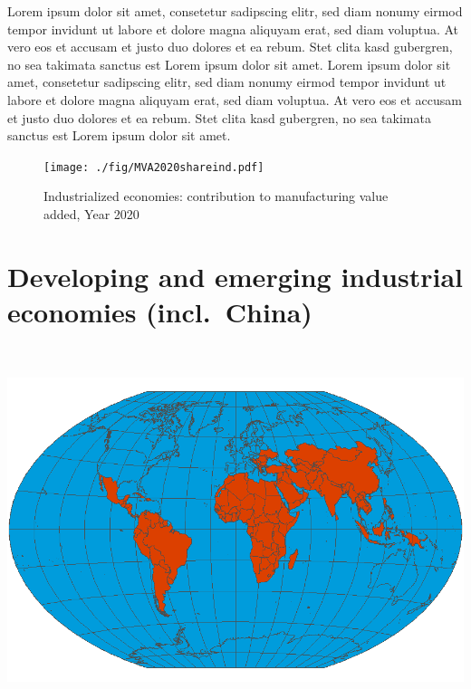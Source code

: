 \documentclass[
  openany, nofonts]{tufte-book}
\begin{document}
Lorem ipsum dolor sit amet, consetetur sadipscing elitr, sed diam nonumy eirmod tempor invidunt ut labore et dolore magna aliquyam erat, sed diam voluptua. At vero eos et accusam et justo duo dolores et ea rebum. Stet clita kasd gubergren, no sea takimata sanctus est Lorem ipsum dolor sit amet. Lorem ipsum dolor sit amet, consetetur sadipscing elitr, sed diam nonumy eirmod tempor invidunt ut labore et dolore magna aliquyam erat, sed diam voluptua. At vero eos et accusam et justo duo dolores et ea rebum. Stet clita kasd gubergren, no sea takimata sanctus est Lorem ipsum dolor sit amet.

\vspace*{\fill}

\begin{figure}
\texttt{[image: ./fig/MVA2020shareind.pdf]} \caption[Industrialized economies: contribution to MVA, Year 2020]{Industrialized economies: contribution to manufacturing value added, Year 2020}\label{fig:c03-INDmva}
\end{figure}

\pagebreak

\hypertarget{developing-and-emerging-industrial-economies-incl.-china}{%
\section{Developing and emerging industrial economies (incl.~China)}\label{developing-and-emerging-industrial-economies-incl.-china}}

~

\begin{marginfigure}
\includegraphics[width=1\linewidth]{./img/GROUP_DEVwintri.png} \end{marginfigure}
\end{document}
